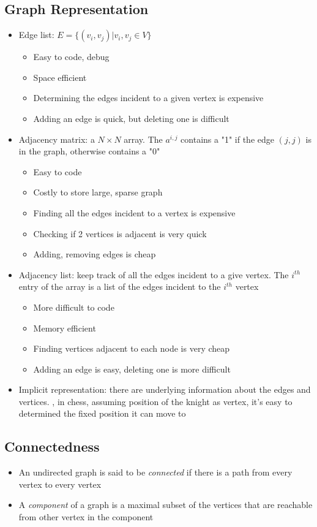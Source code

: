 \subsection{Graph Representation}
\begin{itemize}
	\item Edge list: $E = \{ (v_i, v_j) | v_i, v_j \in V \}$
	\begin{itemize}
		\item Easy to code, debug
		\item Space efficient
		\item Determining the edges incident to a given vertex is expensive
		\item Adding an edge is quick, but deleting one is difficult
	\end{itemize}
	\item Adjacency matrix: a $N \times N$ array. The $a^{i, j}$ contains a "1" if the edge $(j, j)$ is in the graph, otherwise contains a "0"
	\begin{itemize}
		\item Easy to code
		\item Costly to store large, sparse graph
		\item Finding all the edges incident to a vertex is expensive
		\item Checking if 2 vertices is adjacent is very quick
		\item Adding, removing edges is cheap
	\end{itemize}
	\item Adjacency list: keep track of all the edges incident to a give vertex. The $i^{th}$ entry of the array is a list of the edges incident to the $i^{th}$ vertex
	\begin{itemize}
		\item More difficult to code
		\item Memory efficient
		\item Finding vertices adjacent to each node is very cheap
		\item Adding an edge is easy, deleting one is more difficult
	\end{itemize}
	\item Implicit representation: there are underlying information about the edges and vertices. \Eg, in chess, assuming position of the knight as vertex, it's easy to determined the fixed position it can move to
\end{itemize}

\subsection{Connectedness}
\begin{itemize}
	\item An undirected graph is said to be \textit{connected} if there is a path from every vertex to every vertex
	\item A \textit{component} of a graph is a maximal subset of the vertices that are reachable from other vertex in the component
\end{itemize}

